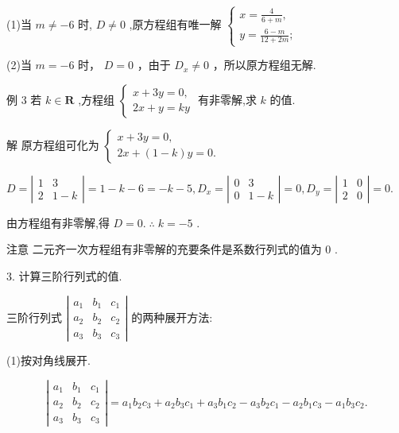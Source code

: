 \documentclass[10pt]{article}
\begin{document}
(1)当 \(m \neq   - 6\) 时, \(D \neq  0\) ,原方程组有唯一解 \(\left\{  \begin{array}{l} x = \frac{4}{6 + m}, \\  y = \frac{6 - m}{{12} + {2m}}; \end{array}\right.\)

(2)当 \(m =  - 6\) 时， \(D = 0\) ，由于 \({D}_{x} \neq  0\) ，所以原方程组无解.

例 3 若 \(k \in  \mathbf{R}\) ,方程组 \(\left\{  \begin{array}{l} x + {3y} = 0, \\  {2x} + y = {ky} \end{array}\right.\) 有非零解,求 \(k\) 的值.

解 原方程组可化为 \(\left\{  \begin{array}{l} x + {3y} = 0, \\  {2x} + \left( {1 - k}\right) y = 0. \end{array}\right.\)

\(D = \left| \begin{matrix} 1 & 3 \\  2 & 1 - k \end{matrix}\right|  = 1 - k - 6 =  - k - 5,{D}_{x} = \left| \begin{matrix} 0 & 3 \\  0 & 1 - k \end{matrix}\right|  = 0,{D}_{y} = \left| \begin{array}{ll} 1 & 0 \\  2 & 0 \end{array}\right|  = 0.\)

由方程组有非零解,得 \(D = 0.\;\therefore \;k =  - 5\) .

注意 二元齐一次方程组有非零解的充要条件是系数行列式的值为 0 .

3. 计算三阶行列式的值.

三阶行列式 \(\left| \begin{array}{lll} {a}_{1} & {b}_{1} & {c}_{1} \\  {a}_{2} & {b}_{2} & {c}_{2} \\  {a}_{3} & {b}_{3} & {c}_{3} \end{array}\right|\) 的两种展开方法:

(1)按对角线展开.

\[
\left| \begin{array}{lll} {a}_{1} & {b}_{1} & {c}_{1} \\  {a}_{2} & {b}_{2} & {c}_{2} \\  {a}_{3} & {b}_{3} & {c}_{3} \end{array}\right|  = {a}_{1}{b}_{2}{c}_{3} + {a}_{2}{b}_{3}{c}_{1} + {a}_{3}{b}_{1}{c}_{2} - {a}_{3}{b}_{2}{c}_{1} - {a}_{2}{b}_{1}{c}_{3} - {a}_{1}{b}_{3}{c}_{2}.
\]
\end{document}
